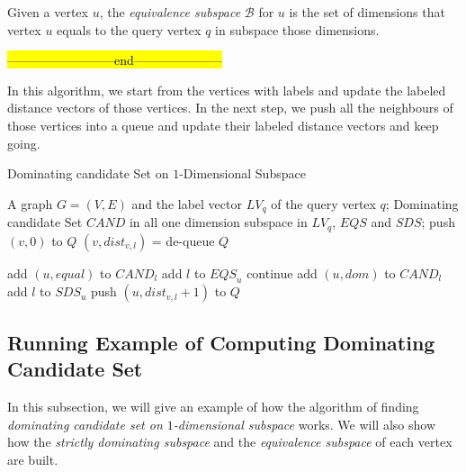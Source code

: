 \begin{definition}
Given a vertex $u$, the \emph{equivalence subspace} $\mathcal{B}$ for $u$ is the set of dimensions that vertex $u$ equals to the query vertex $q$ in subspace those dimensions.
\end{definition}
\hl{--------------------------end---------------------}

In this algorithm, we start from the vertices with labels and update the labeled distance vectors of those vertices. In the next step, we push all the neighbours of those vertices into a queue and update their labeled distance vectors and keep going. 
\begin{algorithm}[h]
  \caption{Dominating candidate Set on $1$-Dimensional Subspace}
  \label{algo:dom_cand_graph}
  \begin{algorithmic}[1]
  \show\LOOP
    \REQUIRE A graph $G=(V,E)$ and the label vector $LV_q$ of the query vertex $q$;
    \ENSURE Dominating candidate Set $\mathit{CAND}$ in all one dimension subspace in $LV_q$, $\mathit{EQS}$ and $\mathit{SDS}$;
            \STATE push $\left(v, 0\right)$ to $Q$
        \ENDFOR
    \ENDFOR
            \STATE $\left(v, dist_{v,l}\right)$ = de-queue $Q$
            
                \STATE add $\left(u, equal\right)$ to $\mathit{CAND}_l$
                \STATE add $l$ to $\mathit{EQS}_u$
                \STATE continue
            \ENDIF
            \STATE add $\left(u, dom\right)$ to $\mathit{CAND}_l$
            \STATE add $l$ to $\mathit{SDS}_u$
                \STATE push $\left(u, dist_{v,l}+1\right)$ to $Q$
            \ENDFOR
        \ENDFOR
    \ENDWHILE
  \end{algorithmic}
\end{algorithm}

\subsection{Running Example of Computing Dominating Candidate Set}
\label{dom:run_ex}
In this subsection, we will give an example of how the algorithm of finding \emph{dominating candidate set on $1$-dimensional subspace} works. We will also show how the \emph{strictly dominating subspace} and the \emph{equivalence subspace} of each vertex are built.

